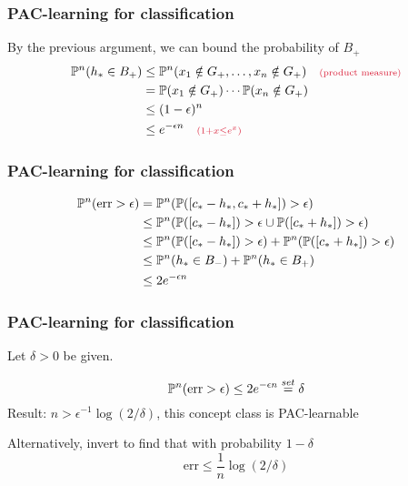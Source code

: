 \documentclass[12pt]{beamer}
\newcommand{\parenthetical}[2]{#1  \scriptstyle \alr{( #2)}}
\begin{document}
\begin{frame}[fragile]
\frametitle{PAC-learning for classification}
\vsp


By the previous argument, we can bound the probability of $B_+$
\begin{align*}
\P^n(h_* \in B_+) 
& \leq 
\P^n(x_1 \notin G_+,\ldots, x_n \notin G_+)  \parenthetical{\quad}{\textrm{product measure}}\\
& =
\P(x_1 \notin G_+)\cdots\P(x_n \notin G_+) \\
& \leq
(1-\epsilon)^n  \\
& \leq
e^{-\epsilon n} \parenthetical{\quad}{1+x \leq e^{x}}
\end{align*}
\end{frame}

\begin{frame}[fragile]
\frametitle{PAC-learning for classification}

\vsp
{}


\begin{align*}
\P^n (\textrm{err} > \epsilon) 
& =
\P^n(\P([c_*-h_*,c_*+h_*] )> \epsilon) \\
& \leq
\P^n(\P([c_*-h_*])>\epsilon \cup \P([c_*+h_*])> \epsilon) \\
& \leq
\P^n(\P([c_*-h_*])>\epsilon) +  \P^n(\P([c_*+h_*])> \epsilon) \\
& \leq
\P^n(h_* \in B_-) +  \P^n(h_* \in B_+) \\
& \leq 
2e^{-\epsilon n}
\end{align*}
\end{frame}
\begin{frame}[fragile]
\frametitle{PAC-learning for classification}
\vsp

\vsp

Let $\delta > 0$ be given.

\[
\P^n (\textrm{err} > \epsilon)  \leq 2e^{-\epsilon n} \stackrel{set}{=} \delta
\]
Result: $n > \epsilon^{-1} \log(2/\delta)$, this concept class 
is PAC-learnable

\vsp
Alternatively, invert to find that with probability $1-\delta$
\[
\textrm{err} \leq \frac{1}{n} \log(2/\delta)
\]

\end{frame}
\end{document}

